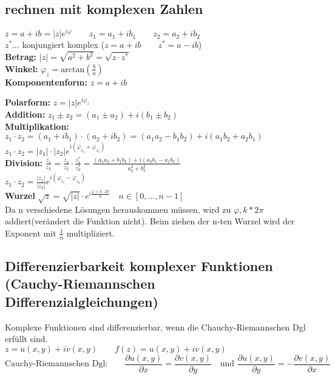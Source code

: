 \subsection{rechnen mit komplexen Zahlen}
$z = a +ib = |z|e^{i \varphi} \qquad z_1 = a_1+ib_1 \qquad z_2 = a_2+ib_2$\\
$z^*$... konjungiert komplex ($z=a+ib \qquad z^*=a-ib$)\\

\textbf{Betrag:} $|z| = \sqrt{a^2+b^2} = \sqrt{z\cdot z^*}$\\
\textbf{Winkel:} $\varphi _z = \text{arctan}(\frac{b}{a})$\\

\textbf{Komponentenform:} $z=a+ib$

\textbf{Polarform:} $z = |z|e^{i\varphi _z}$\\

\textbf{Addition:} $z_1 \pm z_2 = (a_1 \pm a_2) + i(b_1 \pm b_2)$\\

\textbf{Multiplikation:} $z_1 \cdot z_2 = (a_1 + ib_1) \cdot (a_2 + ib_2) = (a_1a_2 - b_1b_2) + i(a_1b_2 + a_2b_1)$\\
$z_1\cdot z_2 = |z_1|\cdot |z_2|e^{i(\varphi _{z_1} +\varphi _{z_2})}$\\


\textbf{Division:} $\frac{z_1}{z_2}=\frac{z_1}{z_2} \cdot \frac{z_1^*}{z_2^*} = \frac{(a_1a_2+b_1b_2)+i(a_2b_1-a_1b_2)}{a_2^2+b_2^2}$\\
$z_1 \cdot z_2 = \frac{|z_1|}{|z_2|}e^{i(\varphi _{z_1} -\varphi _{z_2})}$\\

\textbf{Wurzel} $\sqrt{z} = \sqrt{|z|}\cdot e^{i \frac{\varphi +k\cdot 2\pi}{n}} \quad n \in [0,...,n-1]$\\
Da n verschiedene Lösungen herauskommen müssen, wird zu $\varphi, k*2\pi$ addiert(verändert die Funktion nicht). Beim ziehen der n-ten Wurzel wird der Exponent mit $\frac{1}{n}$ multipliziert.

\subsection{Differenzierbarkeit komplexer Funktionen (Cauchy-Riemannschen Differenzialgleichungen)}

Komplexe Funktionen sind differenzierbar, wenn die Chauchy-Riemannschen Dgl erfüllt sind.\\

$z=u(x,y) + iv(x,y)\qquad f(z) = u(x,y) + iv(x,y)$\\

\[\text{Cauchy-Riemannschen Dgl:}\qquad \frac{\partial u(x,y)}{\partial x} = \frac{\partial v(x,y)}{\partial y} \quad \text{und } \frac{\partial u(x,y)}{\partial y} = - \frac{\partial v(x,y)}{\partial x} \]